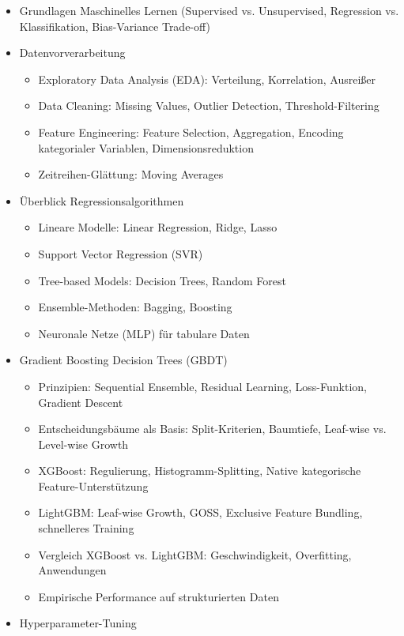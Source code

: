 \begin{itemize}
  \item Grundlagen Maschinelles Lernen (Supervised vs. Unsupervised, Regression vs. Klassifikation, Bias-Variance Trade-off)
  \item Datenvorverarbeitung
  \begin{itemize}
    \item Exploratory Data Analysis (EDA): Verteilung, Korrelation, Ausreißer
    \item Data Cleaning: Missing Values, Outlier Detection, Threshold-Filtering
    \item Feature Engineering: Feature Selection, Aggregation, Encoding kategorialer Variablen, Dimensionsreduktion
    \item Zeitreihen-Glättung: Moving Averages
  \end{itemize}
  \item Überblick Regressionsalgorithmen
  \begin{itemize}
    \item Lineare Modelle: Linear Regression, Ridge, Lasso
    \item Support Vector Regression (SVR)
    \item Tree-based Models: Decision Trees, Random Forest
    \item Ensemble-Methoden: Bagging, Boosting
    \item Neuronale Netze (MLP) für tabulare Daten
  \end{itemize}
  \item Gradient Boosting Decision Trees (GBDT)
  \begin{itemize}
    \item Prinzipien: Sequential Ensemble, Residual Learning, Loss-Funktion, Gradient Descent
    \item Entscheidungsbäume als Basis: Split-Kriterien, Baumtiefe, Leaf-wise vs. Level-wise Growth
    \item XGBoost: Regulierung, Histogramm-Splitting, Native kategorische Feature-Unterstützung
    \item LightGBM: Leaf-wise Growth, GOSS, Exclusive Feature Bundling, schnelleres Training
    \item Vergleich XGBoost vs. LightGBM: Geschwindigkeit, Overfitting, Anwendungen
    \item Empirische Performance auf strukturierten Daten
  \end{itemize}
  \item Hyperparameter-Tuning
  \begin{itemize}

\end{itemize}
\end{itemize}
